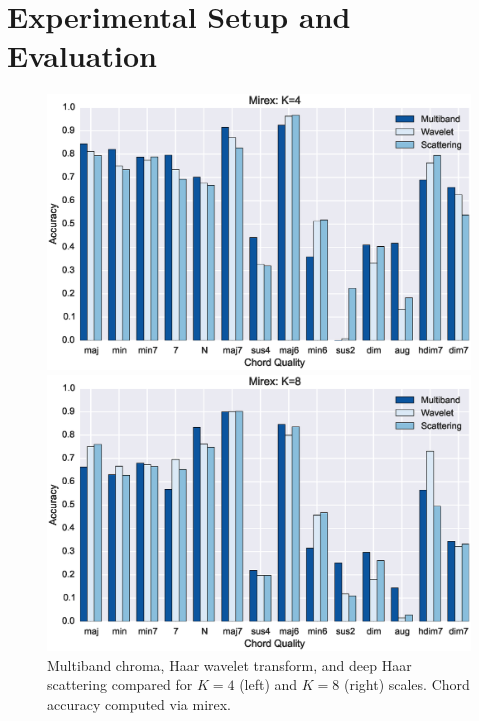 \documentclass{article}
\begin{document}
\section{Experimental Setup and Evaluation}\label{sec:experiment}

\begin{figure}[h!]
\centering
\begin{minipage}{\columnwidth}
	\centering
	\includegraphics[width=1.05\columnwidth]{figs/mirex4.eps}
\end{minipage}
\begin{minipage}{\columnwidth}
	\centering
	\includegraphics[width=1.05\columnwidth]{figs/mirex8.eps}
\end{minipage}
\caption{Multiband chroma, Haar wavelet transform, and deep Haar scattering compared for $K=4$ (left) and $K=8$ (right) scales. Chord accuracy computed via mirex.}
\label{fig:mirex}
\end{figure}
\end{document}
